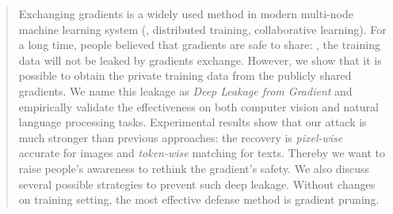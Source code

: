 \begin{abstract}

Exchanging gradients is a widely used method in modern multi-node machine learning system (\eg, distributed training, collaborative learning). For a long time, people believed that gradients are safe to share: \ie, the training data will not be leaked by gradients exchange. However, we show that it is possible to obtain the private training data from the publicly shared gradients. We name this leakage as \textit{Deep Leakage from Gradient} and empirically validate the effectiveness on both computer vision and natural language processing tasks. Experimental results show that our attack is much stronger than previous approaches: the recovery is \emph{pixel-wise} accurate for images and \emph{token-wise} matching for texts. Thereby we want to raise people's awareness to rethink the gradient's safety. We also discuss several possible strategies to prevent such deep leakage. Without changes on training setting, the most effective defense method is gradient pruning. 

\end{abstract}
 

